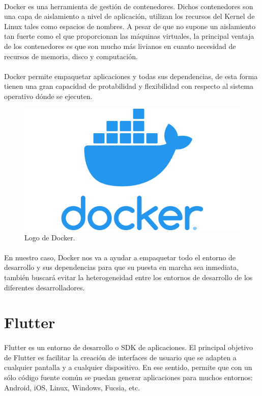 \paragraph{}Docker es una herramienta de gestión de contenedores. Dichos contenedores son
una capa de aislamiento a nivel de aplicación, utilizan los recursos del Kernel de Linux
tales como espacios de nombres. A pesar de que no supone un aislamiento tan fuerte como
el que proporcionan las máquinas virtuales, la principal ventaja de los contenedores es
que son mucho más livianos en cuanto necesidad de recursos de memoria, disco y computación.
\cite{docker}

\paragraph{} Docker permite empaquetar aplicaciones y todas sus dependencias, de esta
forma tienen una gran capacidad de protabilidad y flexibilidad con respecto al sistema
operativo dónde se ejecuten.

\begin{figure}[H]
	\centering
	\includegraphics[width=0.50\linewidth]{imgs/docker-logo}
	\caption[Docker Logo]{Logo de Docker.}
	\label{fig:docker}
\end{figure}

\paragraph{} En nuestro caso, Docker nos va a ayudar a empaquetar todo el entorno de
desarrollo y sus dependencias para que su puesta en marcha sea inmediata, también buscará
evitar la heterogeneidad entre los entornos de desarrollo de los diferentes desarrolladores.


\section{Flutter}\label{sec:flutter}

\paragraph{} Flutter es un entorno de desarrollo o \gls{SDK} de aplicaciones. El principal
objetivo de Flutter es facilitar la creación de interfaces de usuario que se adapten a
cualquier pantalla y a cualquier dispositivo. En ese sentido, permite que con un sólo
código fuente común se puedan generar aplicaciones para muchos entornos: Android, iOS,
Linux, Windows, Fucsia, etc.
\cite{flutter}

